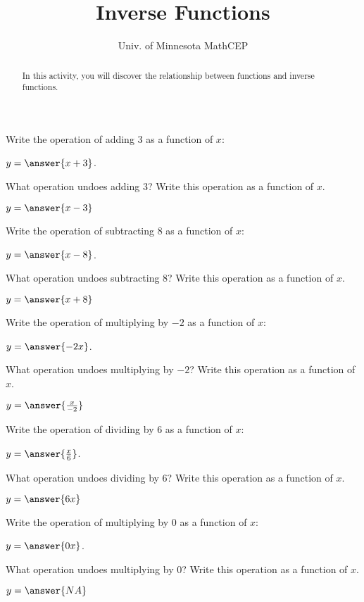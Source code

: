 \documentclass[number]{ximera}
\title{Inverse Functions}
\author{Univ. of Minnesota MathCEP}
\begin{document}
\begin{abstract}
  In this activity, you will discover the relationship between functions and inverse functions.
\end{abstract}

\maketitle

\begin{problem}
Write the operation of adding 3 as a function of $x$:

$y= \answer{x+3}$.

What operation undoes adding 3? Write this operation as a function of $x$.

$y = \answer{x-3}$
\end{problem}

\begin{problem}
Write the operation of subtracting 8 as a function of $x$:

$y= \answer{x-8}$.

What operation undoes subtracting 8? Write this operation as a function of $x$.

$y=\answer{x+8}$
\end{problem}

\begin{problem}
Write the operation of multiplying by $-2$ as a function of $x$:

$y= \answer{-2x}$.

What operation undoes multiplying by $-2$? Write this operation as a function of $x$.

$y=\answer{\frac{x}{-2}}$

\end{problem}

\begin{problem}
Write the operation of dividing by 6 as a function of $x$:

$y= \answer{\frac{x}{6}}$.

What operation undoes dividing by 6? Write this operation as a function of $x$.

$y=\answer{6x}$

\end{problem}

\begin{problem}
Write the operation of multiplying by 0 as a function of $x$:

$y= \answer{0x}$.

What operation undoes multiplying by 0? Write this operation as a function of $x$.

$y=\answer{NA}$
\end{problem}
\end{document}
